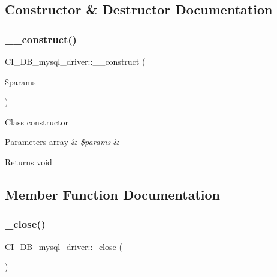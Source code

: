 \subsection{Constructor \& Destructor Documentation}
\mbox{\label{class_c_i___d_b__mysql__driver_a86b2c3a2e1278df844deef6db237a708}} 
\subsubsection{\texorpdfstring{\+\_\+\+\_\+construct()}{\_\_construct()}}
{\footnotesize\ttfamily C\+I\+\_\+\+D\+B\+\_\+mysql\+\_\+driver\+::\+\_\+\+\_\+construct (\begin{DoxyParamCaption}\item[{}]{\$params }\end{DoxyParamCaption})}

Class constructor


\begin{DoxyParams}[1]{Parameters}
array & {\em \$params} & \\
\hline
\end{DoxyParams}
\begin{DoxyReturn}{Returns}
void 
\end{DoxyReturn}


\subsection{Member Function Documentation}
\mbox{\label{class_c_i___d_b__mysql__driver_a392bb4dd401caa562a49bfcc1e13028b}} 
\subsubsection{\texorpdfstring{\+\_\+close()}{\_close()}}
{\footnotesize\ttfamily C\+I\+\_\+\+D\+B\+\_\+mysql\+\_\+driver\+::\+\_\+close (\begin{DoxyParamCaption}{ }\end{DoxyParamCaption})\hspace{0.3cm}{\ttfamily [protected]}}

